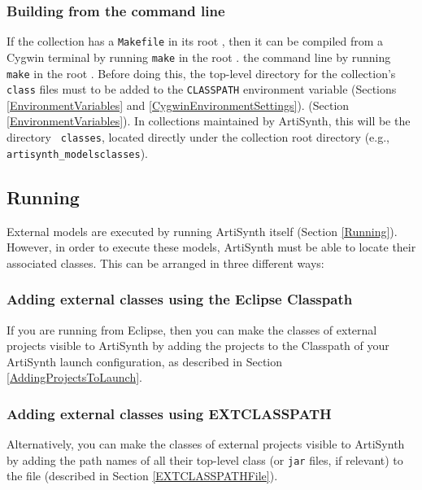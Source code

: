 \subsubsection{Building from the command line}

If the collection has a {\tt Makefile} in its root
\directory{}, then it can be compiled from
\ifWindows
a Cygwin terminal by running {\tt make} in the root \directory{}. 
\else
the command line by running {\tt make} in the root \directory{}.
\fi
Before doing this, the top-level directory for the collection's {\tt
class} files must to be added to the {\tt CLASSPATH} environment
variable
\ifWindows
(Sections \ref{EnvironmentVariables} and \ref{CygwinEnvironmentSettings}).
\else
(Section \ref{EnvironmentVariables}).
\fi
In collections maintained by ArtiSynth, this will be the directory {\tt
classes}, located directly under the collection root directory (e.g.,
{\tt artisynth\_models\SEP classes}).

\subsection{Running}

External models are executed by running ArtiSynth itself (Section
\ref{Running}). However, in order to execute these models, ArtiSynth
must be able to locate their associated classes. This can be
arranged in three different ways:

\subsubsection{Adding external classes using the Eclipse Classpath}

If you are running from Eclipse, then you can make the classes of
external projects visible to ArtiSynth by adding the projects to the
{\sf Classpath} of your ArtiSynth launch configuration, as described
in Section \ref{AddingProjectsToLaunch}.

\subsubsection{Adding external classes using EXTCLASSPATH}

Alternatively, you can make the classes of external projects visible
to ArtiSynth by adding the path names of all their top-level class
\directories{} (or {\tt jar} files, if relevant) to the file 
 (described in Section
\ref{EXTCLASSPATHFile}).


